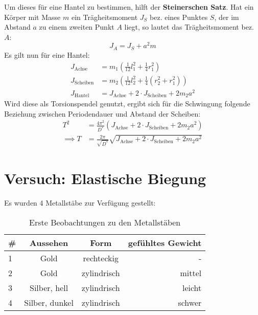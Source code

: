 Um dieses für eine Hantel zu bestimmen, hilft der \textbf{Steinerschen Satz}. Hat ein Körper mit Masse $m$ ein Trägheitsmoment $J_S$ bez. eines Punktes $S$, der im Abstand $a$ zu einem zweiten Punkt $A$ liegt, so lautet das Trägheitsmoment bez. $A$:
\begin{equation}
  J_A=J_S+a^2m
  \label{eq:steiner}
\end{equation}
Es gilt nun für eine Hantel:
\begin{align}
  J_{\text{Achse}}&=m_1\left( \frac{1}{12}l_1^2+\frac{1}{4}r_1^2 \right) \\
  J_{\text{Scheiben}}&=m_2\left(\frac{1}{12}l_2^2+\frac{1}{4}(r_2^2+r_1^2)\right) \\
  J_{\text{Hantel}}&=J_{\text{Achse}}+2\cdot J_{\text{Scheiben}}+2m_2a^2
  \label{eq:hantel}
\end{align}
Wird diese als Torsionspendel genutzt, ergibt sich für die Schwingung folgende Beziehung zwischen Periodendauer und Abstand der Scheiben:
\begin{align}
  T^2&=\frac{4\pi^2}{D^*}(J_{\text{Achse}}+2\cdot J_{\text{Scheiben}}+2m_2a^2) \\
  \implies T&=\frac{2\pi}{\sqrt{D^*}}\sqrt{J_{\text{Achse}}+2\cdot J_{\text{Scheiben}}+2m_2a^2}
  \label{eq:hanteldauer}
\end{align}
\section{Versuch: Elastische Biegung}
Es wurden 4 Metallstäbe zur Verfügung gestellt:
\begin{table}[h]
  \centering
  \begin{tabular}{l | c | c | r}
    \# & Aussehen & Form & gefühltes Gewicht \\ \hline
    1 & Gold & rechteckig & - \\
    2 & Gold & zylindrisch & mittel \\
    3 & Silber, hell & zylindrisch & leicht \\
    4 & Silber, dunkel & zylindrisch & schwer
  \end{tabular}
  \caption{Erste Beobachtungen zu den Metallstäben}
  \label{tab:metall_beob}
\end{table}


